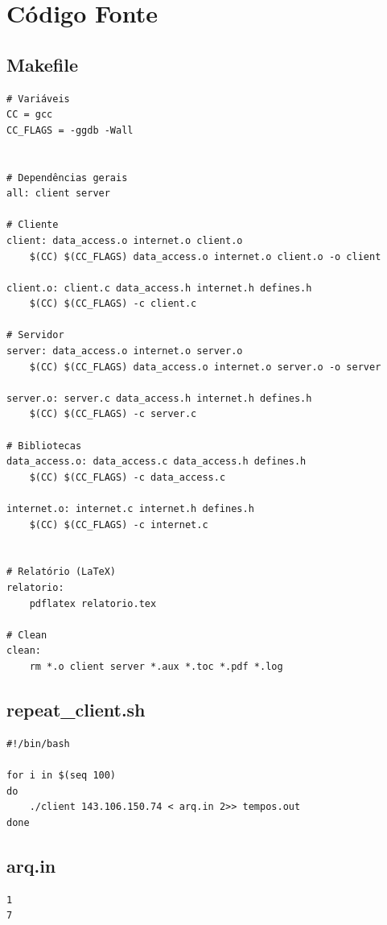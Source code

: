 \documentclass[11pt,twoside]{article}
\begin{document}
\section{Código Fonte}
\subsection{Makefile}
\begin{verbatim}
# Variáveis
CC = gcc
CC_FLAGS = -ggdb -Wall


# Dependências gerais
all: client server

# Cliente
client: data_access.o internet.o client.o
	$(CC) $(CC_FLAGS) data_access.o internet.o client.o -o client

client.o: client.c data_access.h internet.h defines.h
	$(CC) $(CC_FLAGS) -c client.c

# Servidor
server: data_access.o internet.o server.o
	$(CC) $(CC_FLAGS) data_access.o internet.o server.o -o server

server.o: server.c data_access.h internet.h defines.h
	$(CC) $(CC_FLAGS) -c server.c

# Bibliotecas
data_access.o: data_access.c data_access.h defines.h
	$(CC) $(CC_FLAGS) -c data_access.c

internet.o: internet.c internet.h defines.h
	$(CC) $(CC_FLAGS) -c internet.c


# Relatório (LaTeX)
relatorio:
	pdflatex relatorio.tex

# Clean
clean:
	rm *.o client server *.aux *.toc *.pdf *.log
\end{verbatim}

\subsection{repeat\_client.sh}
\begin{verbatim}
#!/bin/bash

for i in $(seq 100)
do
    ./client 143.106.150.74 < arq.in 2>> tempos.out
done
\end{verbatim}

\subsection{arq.in}
\begin{verbatim}
1
7
\end{verbatim}
\end{document}

